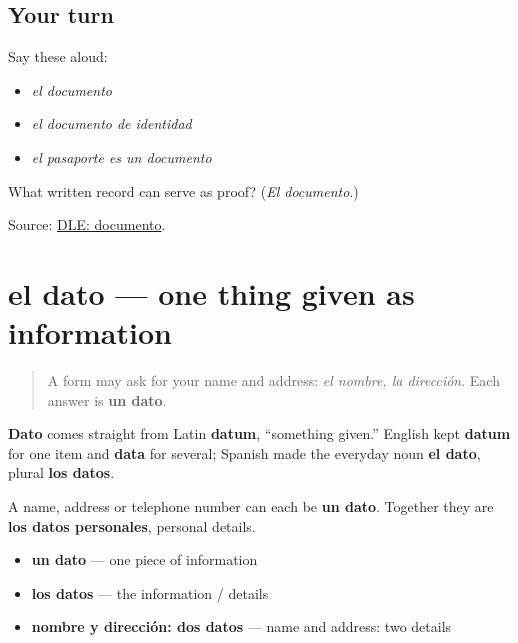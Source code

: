 \subsection*{Your turn}
Say these aloud:

\begin{itemize}
\raggedright
  \item \emph{el documento}
  \item \emph{el documento de identidad}
  \item \emph{el pasaporte es un documento}
\end{itemize}

\begin{tcolorbox}[breakable,colback=teal!4,colframe=teal!35!black,title={Before you move on}]
What written record can serve as proof? (\emph{El documento}.)

Source: \href{https://dle.rae.es/documento}{DLE: documento}.
\end{tcolorbox}
\section[el dato]{el dato — one thing given as information}

\label{lesson:ES-C406-dato}



\begin{quote}
A form may ask for your name and address: \emph{el nombre, la dirección}. Each answer is \textbf{un dato}.
\end{quote}

\begin{cousinweb}
\textbf{Dato} comes straight from Latin \textbf{datum}, “something given.” English kept \textbf{datum} for one item and \textbf{data} for several; Spanish made the everyday noun \textbf{el dato}, plural \textbf{los datos}.

A name, address or telephone number can each be \textbf{un dato}. Together they are \textbf{los datos personales}, personal details.
\end{cousinweb}

\begin{grammarlens}[title={Grammar Lens: one or several}]
\begin{itemize}
\raggedright
  \item \textbf{un dato} — one piece of information
  \item \textbf{los datos} — the information / details
  \item \textbf{nombre y dirección: dos datos} — name and address: two details
\end{itemize}
\end{grammarlens}


